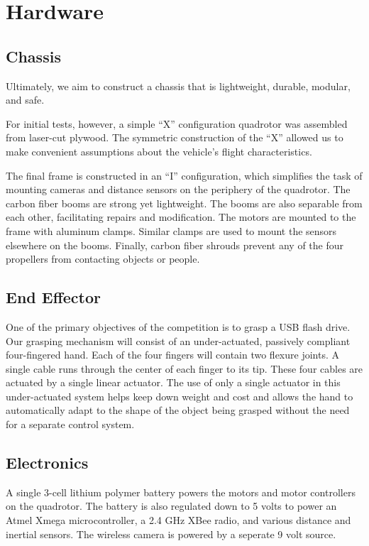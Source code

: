 \documentclass[12pt,letterpaper]{article}
\begin{document}
\section*{Hardware}

\subsection*{Chassis}

Ultimately, we aim to construct a chassis that is lightweight, durable,
modular, and safe.

For initial tests, however, a simple ``X'' configuration quadrotor was
assembled from laser-cut plywood. The symmetric construction of the ``X''
allowed us to make convenient assumptions about the vehicle's flight
characteristics.

The final frame is constructed in an ``I'' configuration, which simplifies the
task of mounting cameras and distance sensors on the periphery of the
quadrotor. The carbon fiber booms are strong yet lightweight. The booms are
also separable from each other, facilitating repairs and modification. The
motors are mounted to the frame with aluminum clamps. Similar clamps are used
to mount the sensors elsewhere on the booms. Finally, carbon fiber shrouds
prevent any of the four propellers from contacting objects or people.


\subsection*{End Effector}

One of the primary objectives of the competition is to grasp a USB flash drive.
Our grasping mechanism will consist of an under-actuated, passively compliant
four-fingered hand. Each of the four fingers will contain two flexure joints. A
single cable runs through the center of each finger to its tip. These four
cables are actuated by a single linear actuator. The use of only a single
actuator in this under-actuated system helps keep down weight and cost and
allows the hand to automatically adapt to the shape of the object being grasped
without the need for a separate control system.


\subsection*{Electronics}

A single 3-cell lithium polymer battery powers the motors and motor controllers
on the quadrotor. The battery is also regulated down to 5 volts to power an
Atmel Xmega microcontroller, a 2.4 GHz XBee radio, and various distance
and inertial sensors. The wireless camera is powered by a seperate 9 volt
source.
\end{document}

